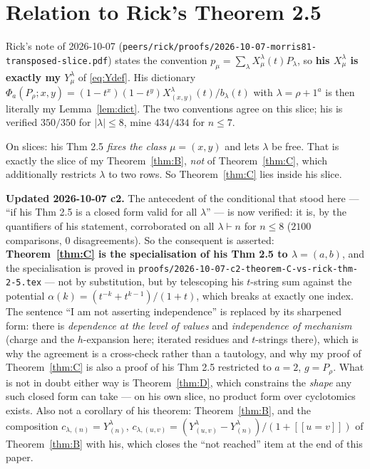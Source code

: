 \documentclass[11pt]{article}
\theoremstyle{plain}
\theoremstyle{definition}
\newcommand{\lam}{\lambda}
\newcommand{\lb}{[\![}
\newcommand{\rb}{]\!]}
\begin{document}
\section{Relation to Rick's Theorem 2.5}

Rick's note of 2026-10-07 (\texttt{peers/rick/proofs/2026-10-07-morris81-transposed-slice.pdf})
states the convention $p_\mu=\sum_\lam X^{\lam}_\mu(t)P_\lam$, so \textbf{his $X^{\lam}_\mu$ is
exactly my $Y^{\lam}_\mu$} of \eqref{eq:Ydef}. His dictionary
$\Phi_a(P_\rho;x,y)=(1-t^x)(1-t^y)X^{\lam}_{(x,y)}(t)/b_\lam(t)$ with $\lam=\rho+1^a$ is then
literally my Lemma~\ref{lem:dict}. The two conventions agree on this slice; his is verified
$350/350$ for $|\lam|\le 8$, mine $434/434$ for $n\le 7$.

On slices: his Thm 2.5 \emph{fixes the class} $\mu=(x,y)$ and lets $\lam$ be free. That is
exactly the slice of my Theorem~\ref{thm:B}, \emph{not} of Theorem~\ref{thm:C}, which additionally
restricts $\lam$ to two rows. So Theorem~\ref{thm:C} lies inside his slice.

\textbf{Updated 2026-10-07 c2.} The antecedent of the conditional that stood here --- ``if his
Thm 2.5 is a closed form valid for all $\lam$'' --- is now verified: it is, by the quantifiers of
his statement, corroborated on all $\lam\vdash n$ for $n\le8$ ($2100$ comparisons, $0$
disagreements). So the consequent is asserted: \textbf{Theorem~\ref{thm:C} is the specialisation of
his Thm 2.5 to $\lam=(a,b)$}, and the specialisation is proved in
\texttt{proofs/2026-10-07-c2-theorem-C-vs-rick-thm-2-5.tex} --- not by substitution, but by
telescoping his $t$-string sum against the potential $\alpha(k)=(t^{-k}+t^{k-1})/(1+t)$, which
breaks at exactly one index. The sentence ``I am not asserting independence'' is replaced by its
sharpened form: there is \emph{dependence at the level of values} and \emph{independence of
mechanism} (charge and the $h$-expansion here; iterated residues and $t$-strings there), which is
why the agreement is a cross-check rather than a tautology, and why my proof of
Theorem~\ref{thm:C} is also a proof of his Thm 2.5 restricted to $a=2$, $g=P_\rho$. What is not in doubt either way is Theorem~\ref{thm:D}, which constrains the
\emph{shape} any such closed form can take --- on his own slice, no product form over cyclotomics
exists.
Also not a corollary of his theorem: Theorem~\ref{thm:B}, and the composition
$c_{\lam,(n)}=Y^\lam_{(n)}$, $c_{\lam,(u,v)}=(Y^\lam_{(u,v)}-Y^\lam_{(n)})/(1+\lb u=v\rb)$ of
Theorem~\ref{thm:B} with his, which closes the ``not reached'' item at the end of this paper.
\end{document}
